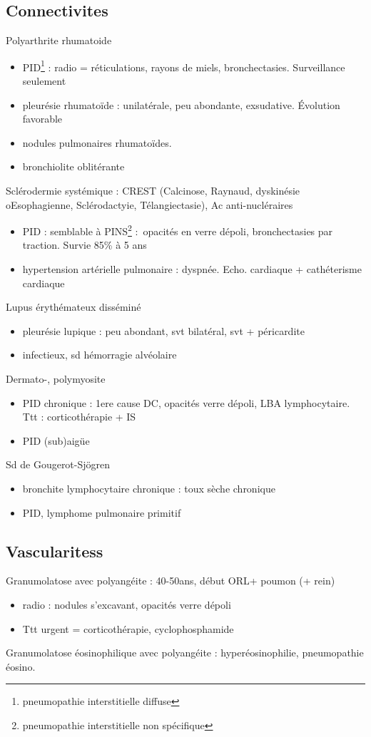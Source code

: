 \subsection{Connectivites}
Polyarthrite rhumatoide
\begin{itemize}
  \item PID\footnote{pneumopathie interstitielle diffuse} : radio =
    réticulations, rayons de miels, bronchectasies. Surveillance seulement
  \item pleurésie rhumatoïde : unilatérale, peu abondante, exsudative. Évolution
    favorable
  \item nodules pulmonaires rhumatoïdes. 
  \item bronchiolite oblitérante
\end{itemize}
Sclérodermie systémique : CREST (Calcinose, Raynaud, dyskinésie oEsophagienne,
Sclérodactyie, Télangiectasie), Ac anti-nucléraires
\begin{itemize}
  \item PID : semblable à PINS\footnote{pneumopathie interstitielle non
    spécifique} : opacités en verre dépoli, bronchectasies par traction. Survie
    85\% à 5 ans
  \item hypertension artérielle pulmonaire : dyspnée. Echo. cardiaque +
    cathéterisme cardiaque
\end{itemize}
Lupus érythémateux disséminé 
\begin{itemize}
  \item pleurésie lupique : peu abondant, svt bilatéral, svt + péricardite
  \item infectieux, sd hémorragie alvéolaire
\end{itemize}
Dermato-, polymyosite
\begin{itemize}
  \item PID chronique : 1ere cause DC, opacités verre dépoli, LBA lymphocytaire.
    Ttt : corticothérapie + IS
  \item PID (sub)aigüe
\end{itemize}
Sd de Gougerot-Sjögren
\begin{itemize}
  \item bronchite lymphocytaire chronique : toux sèche chronique
  \item PID, lymphome pulmonaire primitif
\end{itemize}

\subsection{Vascularitess}
Granumolatose avec polyangéite : 40-50ans, début ORL+ poumon (+ rein)
\begin{itemize}
  \item radio : nodules s'excavant, opacités verre dépoli
  \item Ttt urgent = corticothérapie, cyclophosphamide
\end{itemize}
Granumolatose éosinophilique avec polyangéite :  hyperéosinophilie, pneumopathie
éosino.

